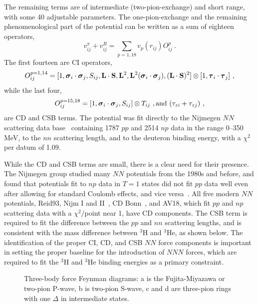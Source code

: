 The remaining terms are of intermediate (two-pion-exchange) and short range,
with some 40 adjustable parameters.
The one-pion-exchange and the remaining phenomenological part of the potential
can be written as a sum of eighteen operators,
\begin{equation}
       v^{\pi}_{ij} + v^{R}_{ij} = \sum_{p=1,18} v_{p}(r_{ij}) O^{p}_{ij} \ .
\end{equation}
The first fourteen are CI operators,
\begin{eqnarray}
O^{p=1,14}_{ij} = [1, \mbox{\boldmath$\sigma$}_{i}\cdot\mbox{\boldmath$\sigma$}_{j}, S_{ij},
{\bf L\cdot S},{\bf L}^{2},{\bf L}^{2}(\mbox{\boldmath$\sigma$}_{i}\cdot\mbox{\boldmath$\sigma$}_{j}),
({\bf L\cdot S})^{2}]\otimes[1,\mbox{\boldmath$\tau$}_{i}\cdot\mbox{\boldmath$\tau$}_{j}] ~,
\label{eq:op14}
\end{eqnarray}
while the last four,
\begin{equation}
   O^{p=15,18}_{ij} = [1, \boldsigma_{i}\cdot\boldsigma_{j},
S_{ij}]\otimes T_{ij} \ ,  {\rm and} \ (\tau_{zi}+\tau_{zj}) \ ,
\end{equation}
are CD and CSB terms.
The potential was fit directly to the Nijmegen $N\!N$ scattering data
base~\cite{SKRS93} containing 1787 $pp$ and 2514 $np$ data in the range 
0--350 MeV, to the $nn$ scattering length, and to the deuteron binding energy,
with a $\chi^2$ per datum of 1.09.

While the CD and CSB terms are small, there is a clear need for their presence.
The Nijmegen group studied many $N\!N$ potentials from the 1980s and
before, and found that potentials fit to $np$ data in $T=1$ states did
not fit $pp$ data well even after allowing for standard Coulomb effects,
and vice versa~\cite{SS93-95}.
All five modern $N\!N$ potentials, Reid93, Nijm I and II~\cite{SKTS94},
CD Bonn~\cite{MSS96}, and AV18, which fit $pp$ and $np$
scattering data with a $\chi^2/$point near 1, have CD components.
The CSB term is required to fit the difference between the $pp$ and
$nn$ scattering lengths, and is consistent
with the mass difference between $^3$H and $^3$He, as shown below.
The identification of the proper CI, CD, and CSB $N\!N$ force components is 
important in setting the proper baseline for the introduction of $N\!N\!N$
forces, which are required to fit the $^3$H and $^3$He binding
energies as a primary constraint.

\begin{figure}
\centerline{}
\caption{Three-body force Feynman diagrams: a is the Fujita-Miyazawa or 
two-pion P-wave, b is two-pion S-wave, c and d are three-pion rings with 
one $\Delta$ in intermediate states.}
\label{fig:vijk}
\end{figure}

